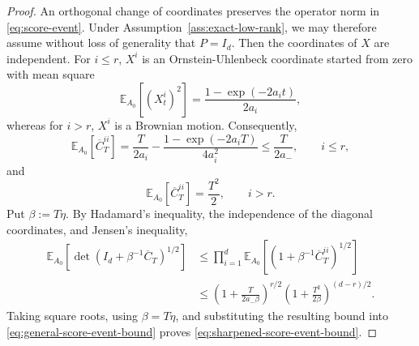 \documentclass[11pt]{article}
\begin{document}
\begin{proof}
An orthogonal change of coordinates preserves the operator norm in
\eqref{eq:score-event}. Under Assumption~\ref{ass:exact-low-rank}, we may
therefore assume without loss of generality that $P=I_d$. Then the coordinates
of $X$ are independent. For $i\leq r$, $X^i$ is an
Ornstein-Uhlenbeck coordinate started from zero with mean square
\[
    \mathbb E_{A_0}\!\left[(X_t^i)^2\right]
    =\frac{1-\exp(-2a_it)}{2a_i},
\]
whereas for $i>r$, $X^i$ is a Brownian motion. Consequently,
\begin{equation}
    \mathbb E_{A_0}[\overline C_T^{ii}]
    =\frac{T}{2a_i}
      -\frac{1-\exp(-2a_iT)}{4a_i^2}
    \leq\frac{T}{2a_-},
    \qquad i\leq r,
\label{eq:stable-diagonal-covariance-expectation}
\end{equation}
and
\begin{equation}
    \mathbb E_{A_0}[\overline C_T^{ii}]
    =\frac{T^2}{2},
    \qquad i>r.
\label{eq:brownian-diagonal-covariance-expectation}
\end{equation}
\noindent
Put $\beta:=T\eta$. By Hadamard's inequality, the independence of the diagonal
coordinates, and Jensen's inequality,
\begin{align*}
    \mathbb E_{A_0}\!\left[
        \det\!\left(I_d+\beta^{-1}\overline C_T\right)^{1/2}
    \right]
    &\leq
    \prod_{i=1}^d
    \mathbb E_{A_0}\!\left[
        \left(1+\beta^{-1}\overline C_T^{ii}\right)^{1/2}
    \right] \\
    &\leq
    \left(1+\frac{T}{2a_-\beta}\right)^{r/2}
    \left(1+\frac{T^2}{2\beta}\right)^{(d-r)/2}.
\end{align*}
Taking square roots, using $\beta=T\eta$, and substituting the resulting bound
into \eqref{eq:general-score-event-bound} proves
\eqref{eq:sharpened-score-event-bound}.
\end{proof}
\end{document}
